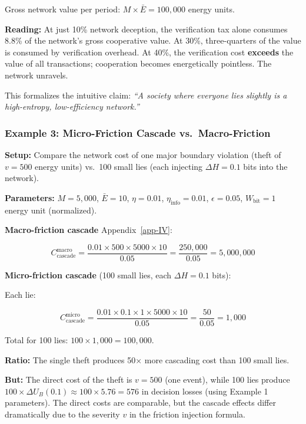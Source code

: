 \documentclass[11pt]{article}
\theoremstyle{plain}
\theoremstyle{definition}
\theoremstyle{remark}
\let\origsubsubsection\subsubsection
\renewcommand{\subsubsection}{\needspace{4\baselineskip}\origsubsubsection}
\begin{document}
Gross network value per period: \(M \times \bar{E} = 100{,}000\) energy
units.

\textbf{Reading:} At just 10\% network deception, the verification tax
alone consumes 8.8\% of the network's gross cooperative value. At 30\%,
three-quarters of the value is consumed by verification overhead. At
40\%, the verification cost \textbf{exceeds} the value of all
transactions; cooperation becomes energetically pointless. The network
unravels.

This formalizes the intuitive claim: \emph{``A society where everyone
lies slightly is a high-entropy, low-efficiency network.''}

\subsubsection{Example 3: Micro-Friction Cascade
vs.~Macro-Friction}\label{example-3-micro-friction-cascade-vs.-macro-friction}

\textbf{Setup:} Compare the network cost of one major boundary violation
(theft of \(v = 500\) energy units) vs.~100 small lies (each injecting
\(\Delta H = 0.1\) bits into the network).

\textbf{Parameters:} \(M = 5{,}000\), \(\bar{E} = 10\), \(\eta = 0.01\),
\(\eta_{\text{info}} = 0.01\), \(\epsilon = 0.05\),
\(W_{\text{bit}} = 1\) energy unit (normalized).

\textbf{Macro-friction cascade} Appendix~\ref{app-IV}:

\[C_{\text{cascade}}^{\text{macro}} = \frac{0.01 \times 500 \times 5000 \times 10}{0.05} = \frac{250{,}000}{0.05} = 5{,}000{,}000\]

\textbf{Micro-friction cascade} (100 small lies, each \(\Delta H = 0.1\)
bits):

Each lie:

\[C_{\text{cascade}}^{\text{micro}} = \frac{0.01 \times 0.1 \times 1 \times 5000 \times 10}{0.05} = \frac{50}{0.05} = 1{,}000\]

Total for 100 lies: \(100 \times 1{,}000 = 100{,}000\).

\textbf{Ratio:} The single theft produces 50× more cascading cost than
100 small lies.

\textbf{But:} The direct cost of the theft is \(v = 500\) (one event),
while 100 lies produce
\(100 \times \Delta U_B(0.1) \approx 100 \times 5.76 = 576\) in decision
losses (using Example 1 parameters). The direct costs are comparable,
but the cascade effects differ dramatically due to the severity \(v\) in
the friction injection formula.
\end{document}
